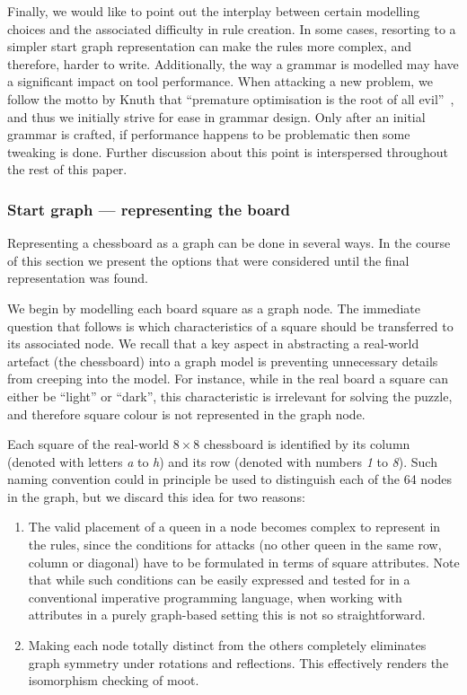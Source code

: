 Finally, we would like to point out the interplay between certain modelling
choices and the associated difficulty in rule creation. In some cases,
resorting to a simpler start graph representation can make the rules more
complex, and therefore, harder to write. Additionally, the way a grammar is
modelled may have a significant impact on tool performance. When attacking a
new problem, we follow the motto by Knuth that ``premature optimisation is the
root of all evil''~\cite{Knu74}, and thus we initially strive for ease in
grammar design. Only after an initial grammar is crafted, if performance
happens to be problematic then some tweaking is done. Further discussion about
this point is interspersed throughout the rest of this paper.

\subsubsection{Start graph --- representing the board}

Representing a chessboard as a graph can be done in several ways. In the course
of this section we present the options that were considered until the final
representation was found.

We begin by modelling each board square as a graph node. The immediate question
that follows is which characteristics of a square should be transferred to its
associated node. We recall that a key aspect in abstracting a real-world
artefact (the chessboard) into a graph model is preventing unnecessary details
from creeping into the model. For instance, while in the real board a square
can either be ``light'' or ``dark'', this characteristic is irrelevant for
solving the puzzle, and therefore square colour is not represented in the graph
node.

Each square of the real-world $8 \times 8$ chessboard is identified by its
column (denoted with letters \emph{a} to \emph{h}) and its row (denoted with
numbers \emph{1} to \emph{8}). Such naming convention could in principle be
used to distinguish each of the 64 nodes in the graph, but we discard this
idea for two reasons:
%
\vspace{-3pt}
\begin{enumerate}\itemsep0pt
\item The valid placement of a queen in a node becomes complex to represent
in the rules, since the conditions for attacks (no other queen in the same row,
column or diagonal) have to be formulated in terms of square attributes. Note
that while such conditions can be easily expressed and tested for in a
conventional imperative programming language, when working with attributes in a
purely graph-based setting this is not so straightforward.
%
\item Making each node totally distinct from the others completely eliminates
graph symmetry under rotations and reflections. This effectively
renders the isomorphism checking of \GROOVE moot.
\end{enumerate}

